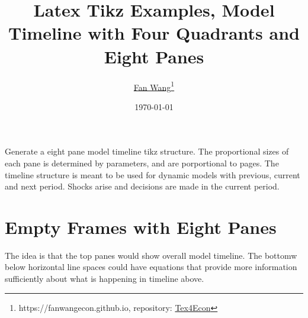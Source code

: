 \documentclass{article}
\title{Latex Tikz Examples, Model Timeline with Four Quadrants and Eight Panes}
\author{\href{https://fanwangecon.github.io/}{Fan Wang}\thanks{https://fanwangecon.github.io, repository: \href{https://fanwangecon.github.io/Tex4Econ/}{Tex4Econ}}}
\date{\today}
\newcommand{\tikzframeeight}[7]{

  \def\fgiw{#1*\textwidth*#7}  
  \def\fgih{#2*\textheight*#7}

  \def\fgiwm{#3*\fgiw}
  \def\fgihm{#4*\fgih}

  \def\fgile{#5*\fgiw}
  \def\fgire{#6*\fgiw}

  \def\fgiwlm{\fgile*0.5 + \fgiwm*0.5}
  \def\fgiwrm{\fgiwm*0.5 + \fgire*0.5}

  \def\fgihtb{\fgihm + \fgih*0.085 - \fgihm*0.085}


  \draw [solid] (0, \fgih) -- (\fgiw, \fgih);
  \draw [solid] (0, 0    ) -- (\fgiw, 0    );

  \draw [solid] (0,     0) -- (0,     \fgih);
  \draw [solid] (\fgiw, 0) -- (\fgiw, \fgih);

  \draw [solid] (\fgiwm, 0) -- (\fgiwm,   \fgih);
  \draw [solid] (0, \fgihm) -- (\fgiw,   \fgihm);

  \draw[dashed] (\fgile, 0  ) -- (\fgile,   \fgih);
  \draw[dashed] (\fgire, 0  ) -- (\fgire,   \fgih);

  \node[align=center] at (0.5*\fgile,             0.900*\fgih) {last\\period};
  \node[align=center] at (0.5*\fgiw,              0.900*\fgih) {current period};
  \node[align=center] at (0.5*\fgire + 0.5*\fgiw, 0.900*\fgih) {next\\period};

  \node[align=center] at (\fgiwlm, \fgihtb) {shocks};
  \node[align=center] at (\fgiwrm, \fgihtb) {asset choices};
}
\begin{document}
\maketitle

Generate a eight pane model timeline tikz structure. The proportional sizes of each pane is determined by parameters, and are porportional to pages. The timeline structure is meant to be used for dynamic models with previous, current and next period. Shocks arise and decisions are made in the current period. 


\section{Empty Frames with Eight Panes}

The idea is that the top panes would show overall model timeline. The bottomw below horizontal line spaces could have equations that provide more information sufficiently about what is happening in timeline above. 


\begin{center}
\end{center}

\begin{center}
\end{center}

\begin{center}
\end{center}

  
\end{document}
